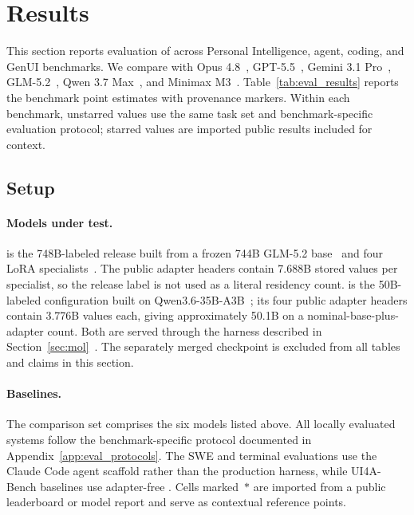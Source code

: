 \section{Results}
\label{sec:results}

This section reports evaluation of \macaron{} across Personal Intelligence, agent, coding, and GenUI benchmarks. We compare \venti{} with Opus 4.8~\citep{anthropic_opus48_2026}, GPT-5.5~\citep{openai_gpt55_2026}, Gemini 3.1 Pro~\citep{gemini31pro_2026}, GLM-5.2~\citep{glm52_2026,glm5_2026}, Qwen 3.7 Max~\citep{qwen37max_2026}, and Minimax M3~\citep{minimax_m3_2026}. Table~\ref{tab:eval_results} reports the benchmark point estimates with provenance markers. Within each benchmark, unstarred values use the same task set and benchmark-specific evaluation protocol; starred values are imported public results included for context.

\subsection{Setup}
\label{sec:results_setup}

\paragraph{Models under test.}
\venti{} is the 748B-labeled release built from a frozen 744B GLM-5.2 base~\citep{glm52_2026,glm5_2026} and four LoRA specialists~\citep{lora2022}. The public adapter headers contain 7.688B stored values per specialist, so the release label is not used as a literal residency count. \tall{} is the 50B-labeled configuration built on Qwen3.6-35B-A3B~\citep{qwen36_2026,qwen3_2025}; its four public adapter headers contain 3.776B values each, giving approximately 50.1B on a nominal-base-plus-adapter count. Both are served through the \molshort{} harness described in Section~\ref{sec:mol}~\citep{mol_harness2026}. The separately merged \codingventi{} checkpoint is excluded from all tables and claims in this section.

\paragraph{Baselines.}
The comparison set comprises the six models listed above. All locally evaluated systems follow the benchmark-specific protocol documented in Appendix~\ref{app:eval_protocols}. The SWE and terminal evaluations use the Claude Code agent scaffold rather than the production \molshort{} harness, while UI4A-Bench baselines use adapter-free \uifora{}. Cells marked~\(\ast\) are imported from a public leaderboard or model report and serve as contextual reference points.

